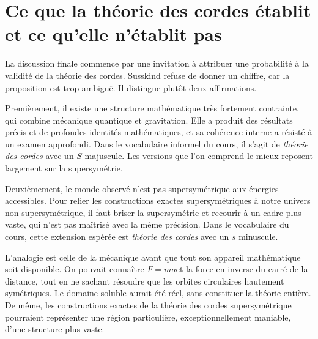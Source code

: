 \section{Ce que la théorie des cordes établit et ce qu’elle n’établit pas}

La discussion finale commence par une invitation à attribuer une probabilité à la validité de la théorie des cordes. Susskind refuse de donner un chiffre, car la proposition est trop ambiguë. Il distingue plutôt deux affirmations.

Premièrement, il existe une structure mathématique très fortement contrainte, qui combine mécanique quantique et gravitation. Elle a produit des résultats précis et de profondes identités mathématiques, et sa cohérence interne a résisté à un examen approfondi. Dans le vocabulaire informel du cours, il s’agit de \emph{théorie des cordes} avec un \(S\) majuscule. Les versions que l’on comprend le mieux reposent largement sur la supersymétrie.

Deuxièmement, le monde observé n’est pas supersymétrique aux énergies accessibles. Pour relier les constructions exactes supersymétriques à notre univers non supersymétrique, il faut briser la supersymétrie et recourir à un cadre plus vaste, qui n’est pas maîtrisé avec la même précision. Dans le vocabulaire du cours, cette extension espérée est \emph{théorie des cordes} avec un \(s\) minuscule.

\begin{classroomqa}
\end{classroomqa}

L’analogie est celle de la mécanique avant que tout son appareil mathématique soit disponible. On pouvait connaître \(F=ma\)et la force en inverse du carré de la distance, tout en ne sachant résoudre que les orbites circulaires hautement symétriques. Le domaine soluble aurait été réel, sans constituer la théorie entière. De même, les constructions exactes de la théorie des cordes supersymétrique pourraient représenter une région particulière, exceptionnellement maniable, d’une structure plus vaste.

